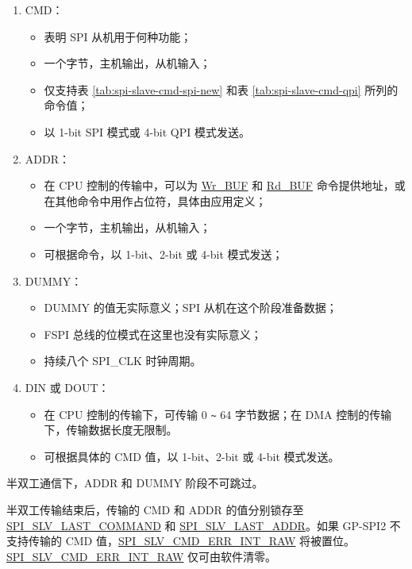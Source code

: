 \documentclass[main\_\_CN.tex]{subfiles}
\begin{document}
\begin{enumerate}
   \item CMD：
        \begin{itemize}
            \item 表明 SPI 从机用于何种功能；
            \item 一个字节，主机输出，从机输入；
            \item 仅支持表 \ref{tab:spi-slave-cmd-spi-new} 和表 \ref{tab:spi-slave-cmd-qpi} 所列的命令值；
            \item 以 1-bit SPI 模式或 4-bit QPI 模式发送。
        \end{itemize}

   \item ADDR：
        \begin{itemize}
            \item 在 CPU 控制的传输中，可以为  \hyperlink{cmd:wrbuf}{Wr\_BUF} 和  \hyperlink{cmd:rdbuf}{Rd\_BUF} 命令提供地址，或在其他命令中用作占位符，具体由应用定义；
            \item 一个字节，主机输出，从机输入；
            \item 可根据命令，以 1-bit、2-bit 或 4-bit 模式发送；
        \end{itemize}

   \item DUMMY：
        \begin{itemize}
            \item DUMMY 的值无实际意义；SPI 从机在这个阶段准备数据；
            \item FSPI 总线的位模式在这里也没有实际意义；
            \item 持续八个 SPI\_CLK 时钟周期。
        \end{itemize}

   \item DIN 或 DOUT：

        \begin{itemize}
            \item 在 CPU 控制的传输下，可传输 0 \verb+~+ 64 字节数据；在 DMA 控制的传输下，传输数据长度无限制。
            \item 可根据具体的 CMD 值，以 1-bit、2-bit 或 4-bit 模式发送。
        \end{itemize}

   \end{enumerate}

\begin{tiplisting}
半双工通信下，ADDR 和 DUMMY 阶段不可跳过。
\end{tiplisting}
\vspace{-1em}
半双工传输结束后，传输的 CMD 和 ADDR 的值分别锁存至 \hyperref[fielddesc:SPISLVLASTCOMMAND]{SPI\_SLV\_LAST\_COMMAND} 和 \hyperref[fielddesc:SPISLVLASTADDR]{SPI\_SLV\_LAST\_ADDR}。如果 GP-SPI2 不支持传输的 CMD 值，\hyperref[fielddesc:SPISLVCMDERRINTRAW]{SPI\_SLV\_CMD\_ERR\_INT\_RAW} 将被置位。 \hyperref[fielddesc:SPISLVCMDERRINTRAW]{SPI\_SLV\_CMD\_ERR\_INT\_RAW} 仅可由软件清零。
\end{document}

